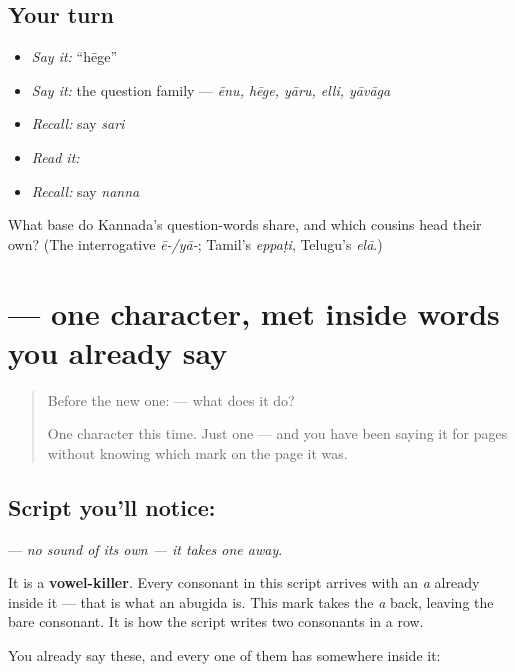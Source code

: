 \subsection*{Your turn}
\begin{itemize}
\raggedright
  \item \emph{Say it:} \textquotedblleft{}hēge\textquotedblright{}
  \item \emph{Say it:} the question family — \emph{ēnu, hēge, yāru, elli, yāvāga}
  \item \emph{Recall:} say \emph{sari}
  \item \emph{Read it:} \textbf{}
  \item \emph{Recall:} say \emph{nanna}
\end{itemize}

\begin{tcolorbox}[breakable,colback=teal!4,colframe=teal!35!black,title={Before you move on}]
What base do Kannada's question-words share, and which cousins head their own? (The interrogative \emph{ē-/yā-}; Tamil's \emph{eppaṭi}, Telugu's \emph{elā}.)
\end{tcolorbox}
\section[\texorpdfstring{\kn{್} (virama)}{್ (virama)}]{ — one character, met inside words you already say}

\label{lesson:KA-S03-sign-virama}



\begin{quote}
Before the new one:  — what does it do?

One character this time. Just one — and you have been saying it for pages without knowing which mark on the page it was.
\end{quote}

\subsection*{Script you'll notice: }
\textbf{} — \emph{no sound of its own — it takes one away}.

It is a \textbf{vowel-killer}. Every consonant in this script arrives with an \emph{a} already inside it — that is what an abugida is. This mark takes the \emph{a} back, leaving the bare consonant. It is how the script writes two consonants in a row.

You already say these, and every one of them has  somewhere inside it:

